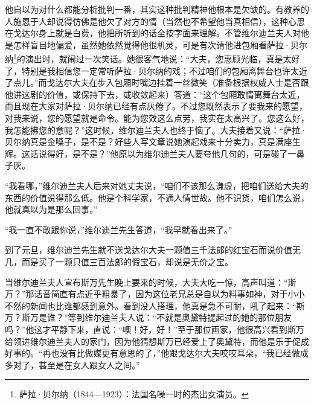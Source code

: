 \par 他自以为对什么都能分析批判一番，其实这种批判精神他根本是欠缺的。有教养的人施恩于人却说得仿佛是他欠了对方的情（当然也不希望他当真相信），这种心思在戈达尔身上就是白费，他把所听到的话全按字面来理解。不管维尔迪兰夫人对他是怎样盲目地偏爱，虽然她依然觉得他很机灵，可是有次请他进包厢看萨拉·贝尔纳\footnote{萨拉·贝尔纳（1844—1923）：法国名噪一时的杰出女演员。}的演出时，就闹过一次笑话。她很客气地说：“大夫，您惠顾光临，真是太好了，特别是我相信您一定常听萨拉·贝尔纳的戏；不过咱们的包厢离舞台也许太近了点儿。”而戈达尔大夫在步入包厢时嘴边挂着一丝微笑（准备根据权威人士是否跟他讲这剧的价值，或保持下去，或收敛起来）答道：“这个包厢敢情离舞台太近，而且现在大家对萨拉·贝尔纳已经有点厌倦了。不过您既然表示了要我来的愿望，对我来说，您的愿望就是命令。能为您效这么点劳，我实在太高兴了。您这么好，我怎能拂您的意呢？”这时候，维尔迪兰夫人也终于恼了。大夫接着又说：“萨拉·贝尔纳真是金嗓子，是不是？好些人写文章说她演起戏来十分卖力，真是满座生辉。这话说得好，是不是？”他原以为维尔迪兰夫人要夸他几句的，可是碰了一鼻子灰。
\par “我看哪，”维尔迪兰夫人后来对她丈夫说，“咱们不该那么谦虚，把咱们送给大夫的东西的价值说得那么低。他是个科学家，不通人情世故。他不识货，咱们怎么说，他就真以为是那么回事。”
\par “我一直不敢跟你说，”维尔迪兰先生答道，“我早就看出来了。”
\par 到了元旦，维尔迪兰先生就不送戈达尔大夫一颗值三千法郎的红宝石而说价值无几，而是买了一颗只值三百法郎的假宝石，却说是无价之宝。
\par 当维尔迪兰夫人宣布斯万先生晚上要来的时候，大夫大吃一惊，高声叫道：“斯万？”那话音简直有点近乎粗暴了，因为这位老兄总是自以为料事如神，对于小小不然的新闻也比谁都感到意外。看到没人搭理，他真是急不可耐，吼了起来：“斯万？斯万是谁？”等到维尔迪兰夫人说：“不就是奥黛特提起过的她的那位朋友吗？”他这才平静下来，直说：“噢！好，好！”至于那位画家，他很高兴看到斯万给领进维尔迪兰夫人的家门，因为他猜想斯万已经爱上了奥黛特，而他是乐于促成好事的。“再也没有比做媒更有意思的了，”他跟戈达尔大夫咬咬耳朵，“我已经做成多对了，甚至是在女人跟女人之间。”
